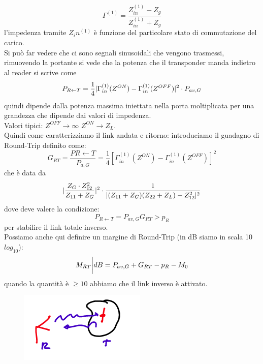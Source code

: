 \documentclass[oneside, 12pt]{extbook}
\DeclarePairedDelimiter{\abs}{\lvert}{\rvert}
\begin{document}
\begin{equation}
	\Gamma^{(1)} = \frac{Z_{in}^{(1)} - Z_g}{Z_{in}^{(1)} + Z_g}
\end{equation}
l'impedenza tramite $Z_in^{(1)}$ è funzione del particolare stato di commutazione del carico.\\Si può far vedere che ci sono segnali sinusoidali che vengono trasmessi, rimuovendo la portante si vede che la potenza che il transponder manda indietro al reader si scrive come
\begin{equation}
	P_{R \leftarrow T} = \frac{1}{4} \abs{\Gamma_{in}^{(1)} (Z^{ON}) - \Gamma_{in}^{(1)}(Z^{OFF})}^2 \cdot P_{av,G}
\end{equation}
quindi dipende dalla potenza massima iniettata nella porta moltiplicata per una grandezza che dipende dai valori di impedenza.\\Valori tipici:
$Z^{OFF} \rightarrow \infty$
$Z^{ON} \rightarrow Z_L$.\\Quindi come caratterizziamo il link andata e ritorno: introduciamo il guadagno di Round-Trip definito come:
\begin{equation}
	G_{RT} = \frac{P{R \leftarrow T}}{P_{a, G}} = \frac{1}{4} [\Gamma_{in}^{(1)} (Z^{ON}) - \Gamma_{in}^{(1)}(Z^{OFF})]^2
\end{equation}
che è data da 
\begin{equation}
	\abs{\dfrac{Z_G \cdot Z_{12}^2}{Z_{11} + Z_G}}^2 \cdot \dfrac{1}{\abs{(Z_{11}+Z_G)(Z_{22}+Z_L) - Z_{12}^2}^2}
\end{equation}
dove deve valere la condizione:
\begin{equation}
	P_{R \leftarrow T} = P_{av,G}G_{RT} > p_R
\end{equation}
per stabilire il link totale inverso.\\Possiamo anche qui definire un margine di Round-Trip (in dB siamo in scala 10$log_{10}$):
\begin{equation}
	M_{RT}\bigg{\rvert{dB}} = P_{av,G} + G_{RT} - p_R - M_0
\end{equation}
quando la quantità è $\geq 10$ abbiamo che il link inverso è attivato.\\
\begin{figure}[!h]
	\includegraphics[scale=0.5]{immagini/read_trans.png}
\end{figure}\\\\
\end{document}
